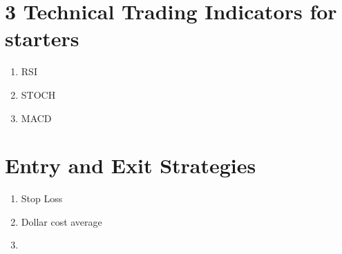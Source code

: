 \section{3 Technical Trading Indicators for starters}
\begin{enumerate}
    \item RSI
    \item STOCH
    \item MACD
\end{enumerate}



\section{Entry and Exit Strategies}
\begin{enumerate}
    \item Stop Loss
    \item Dollar cost average
    \item 
\end{enumerate}

